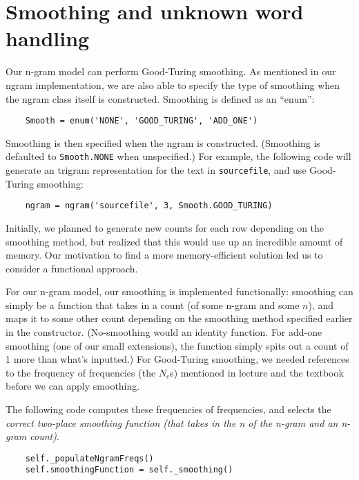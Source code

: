 \documentclass{article}
\begin{document}
\section{Smoothing and unknown word handling}
Our n-gram model can perform Good-Turing smoothing. As mentioned in our ngram implementation, we are also able to specify the type of smoothing when the ngram class itself is constructed. Smoothing is defined as an ``enum'':

{\small\begin{verbatim}
    Smooth = enum('NONE', 'GOOD_TURING', 'ADD_ONE')
\end{verbatim}}

Smoothing is then specified when the ngram is constructed. (Smoothing is defaulted to \texttt{Smooth.NONE} when unspecified.) For example, the following code will generate an trigram representation for the text in \texttt{sourcefile}, and use Good-Turing smoothing:
{\small\begin{verbatim}
    ngram = ngram('sourcefile', 3, Smooth.GOOD_TURING)
\end{verbatim}}

Initially, we planned to generate new counts for each row depending on the smoothing method, but realized that this would use up an incredible amount of memory. Our motivation to find a more memory-efficient solution led us to consider a functional approach.\par
For our n-gram model, our smoothing is implemented functionally: smoothing can simply be a function that takes in a count (of some n-gram and some $n$), and maps it to some other count depending on the smoothing method specified earlier in the constructor. (No-smoothing would an identity function. For add-one smoothing (one of our small extensions), the function simply spits out a count of 1 more than what's inputted.) For Good-Turing smoothing, we needed references to the frequency of frequencies (the $N_c$s) mentioned in lecture and the textbook before we can apply smoothing.\par

The following code computes these frequencies of frequencies, and selects the \emph{correct two-place smoothing function (that takes in the \emph{n} of the n-gram and an n-gram count)}.

{\small\begin{verbatim}
    self._populateNgramFreqs()
    self.smoothingFunction = self._smoothing()
\end{verbatim}}
\end{document}
